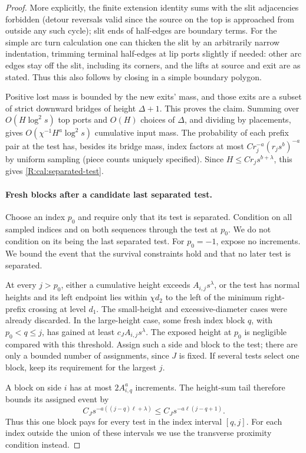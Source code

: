 \begin{proof}
More explicitly, the finite extension identity sums with the slit adjacencies forbidden (detour reversals valid since the source on the top is approached from outside any such cycle); slit ends of half-edges are boundary terms. For the simple arc turn calculation one can thicken the slit by an arbitrarily narrow indentation, trimming terminal half-edges at lip ports slightly if needed: other arc edges stay off the slit, including its corners, and the lifts at source and exit are as stated. Thus this also follows by closing in a simple boundary polygon.

Positive lost mass is bounded by the new exits' mass, and those exits are a subset of strict downward bridges of height \(\Delta+1\). This proves the claim. Summing over \(O(H\log^2 s)\) top ports and \(O(H)\) choices of \(\Delta\), and dividing by placements, gives \(O(\chi^{-1}H^a\log^2 s)\) cumulative input mass. The probability of each prefix pair at the test has, besides its bridge mass, index factors at most \(C r_j^{-a}(r_j s^b)^{-a}\) by uniform sampling (piece counts uniquely specified). Since \(H\le C r_j s^{b+\lambda}\), this gives \eqref{R:cal:separated-test}.

\paragraph{Fresh blocks after a candidate last separated test.}
Choose an index $p_0$ and require only that its test is separated.
Condition on all sampled indices and on both sequences through the test
at $p_0$. We do not condition on its being the last separated test.
For $p_0=-1$, expose no increments. We bound the event that the
survival constraints hold and that no later test is separated.

At every $j>p_0$, either a cumulative height exceeds
$A_{i,j}s^\lambda$, or the test has normal heights and its left endpoint
lies within $\chi d_2$ to the left of the minimum right-prefix crossing
at level $d_1$. The small-height and excessive-diameter cases were
already discarded. In the large-height case, some fresh index block
$q$, with $p_0<q\le j$, has gained at least $c_J A_{i,j}s^\lambda$.
The exposed height at $p_0$ is negligible compared with this threshold.
Assign such a side and block to the test; there are only a bounded
number of assignments, since $J$ is fixed. If several tests select one
block, keep its requirement for the largest $j$.

A block on side $i$ has at most $2A_{i,q}^a$ increments. The height-sum
tail therefore bounds its assigned event by
\[
 C_J s^{-a((j-q)\ell+\lambda)}
 \le C_J s^{-a\ell(j-q+1)}.
\]
Thus this one block pays for every test in the index interval $[q,j]$.
For each index outside the union of these intervals we use the
transverse proximity condition instead.


\end{proof}
